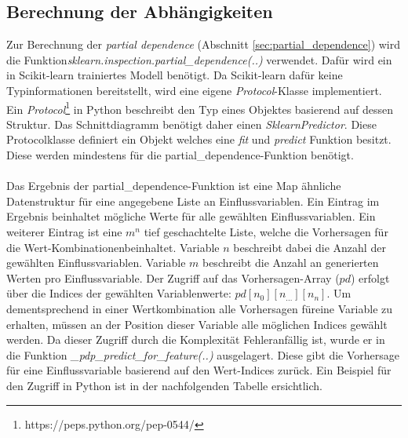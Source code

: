 \subsection{Berechnung der Abhängigkeiten}
\label{subsec:pdp_calculation_visualization}
Zur Berechnung der \emph{partial dependence} (Abschnitt \ref{sec:partial_dependence}) wird die Funktion\linebreak \emph{sklearn.inspection.partial\_dependence(..)} verwendet. Dafür wird ein in Scikit-learn trainiertes Modell benötigt. Da Scikit-learn dafür keine Typinformationen bereitstellt, wird eine eigene \emph{Protocol}-Klasse implementiert. Ein \emph{Protocol}\footnote{https://peps.python.org/pep-0544/} in Python beschreibt den Typ eines Objektes basierend auf dessen Struktur. Das Schnittdiagramm benötigt daher einen \emph{SklearnPredictor}. Diese Protocolklasse definiert ein Objekt welches eine \emph{fit} und \emph{predict} Funktion besitzt. Diese werden mindestens für die partial\_dependence-Funktion benötigt.\\\\
\noindent Das Ergebnis der partial\_dependence-Funktion ist eine Map ähnliche Datenstruktur für eine angegebene Liste an Einflussvariablen. Ein Eintrag im Ergebnis beinhaltet mögliche Werte für alle gewählten Einflussvariablen. Ein weiterer Eintrag ist eine $m^n$ tief geschachtelte Liste, welche die Vorhersagen für die Wert-Kombinationen\linebreak beinhaltet. Variable $n$ beschreibt dabei die Anzahl der gewählten Einflussvariablen. Variable $m$ beschreibt die Anzahl an generierten Werten pro Einflussvariable. Der Zugriff auf das Vorhersagen-Array ($pd$) erfolgt über die Indices der gewählten Variablenwerte: $pd[n_0][n_{...}][n_n]$. Um dementsprechend in einer Wertkombination alle Vorhersagen für\linebreak eine Variable zu erhalten, müssen an der Position dieser Variable alle möglichen Indices gewählt werden. Da dieser Zugriff durch die Komplexität Fehleranfällig ist, wurde er in die Funktion \emph{\_pdp\_predict\_for\_feature(..)} ausgelagert. Diese gibt die Vorhersage für eine Einflussvariable basierend auf den Wert-Indices zurück. Ein Beispiel für den Zugriff in Python ist in der nachfolgenden Tabelle ersichtlich.\\

